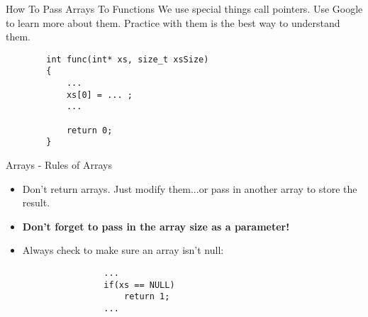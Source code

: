 \documentclass[main.tex]{subfiles}
\begin{document}
\begin{frame}[fragile]{How To Pass Arrays To Functions}
	We use special things call pointers. Use Google to learn more about them.
	Practice with them is the best way to understand them.

	\begin{lstlisting}
		int func(int* xs, size_t xsSize)
		{
			... 
			xs[0] = ... ;
			...

			return 0;
		}
	\end{lstlisting}
\end{frame}

\begin{frame}[fragile]{Arrays - Rules of Arrays}

	\begin{itemize}
		\item Don't return arrays. Just modify them...or pass in another array to
			store the result. 
		\item \textbf{Don't forget to pass in the array size as a parameter!}
		\item Always check to make sure an array isn't null: 
			\begin{lstlisting}
				...
				if(xs == NULL)
					return 1;
				...
				
			\end{lstlisting}
	\end{itemize}

\end{frame}
\end{document}
